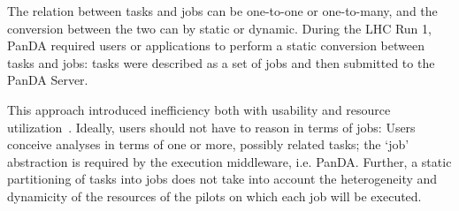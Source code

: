 





The relation between tasks and jobs can be one-to-one or one-to-many, and the
conversion between the two can by static or dynamic. During the LHC Run 1, PanDA
required users or applications to perform a static conversion between tasks and
jobs: tasks were described as a set of jobs
and then submitted to the PanDA Server.

This approach introduced inefficiency both with usability and resource
utilization~\cite{borodin2015unified}. Ideally, users should not have to reason
in terms of jobs: Users conceive analyses in terms of one or more, possibly
related tasks; the `job' abstraction is required by the execution middleware,
i.e. PanDA. Further, a static partitioning of tasks into jobs does not take into
account the heterogeneity and dynamicity of the resources of the pilots on which
each job will be executed.

